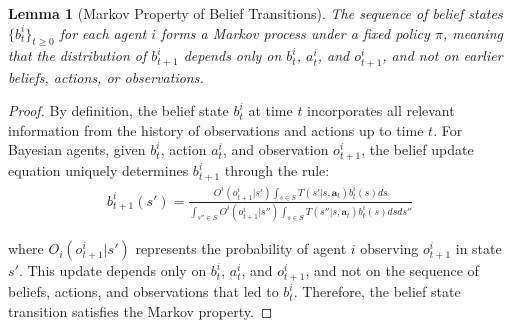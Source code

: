 \documentclass[a4paper,12pt]{report}
\newtheorem{lemma}{Lemma}
\begin{document}
\begin{lemma}[Markov Property of Belief Transitions]
    The sequence of belief states $\{b_{t}^{i}\}_{t \geq 0}$ for each agent $i$ forms
    a Markov process under a fixed policy $\pi$, meaning that the distribution of
    $b_{t+1}^{i}$ depends only on $b_{t}^{i}$, $a_{t}^{i}$, and $o_{t+1}^{i}$, and
    not on earlier beliefs, actions, or observations.
\end{lemma}

\begin{proof}
    By definition, the belief state $b_{t}^{i}$ at time $t$ incorporates all
    relevant information from the history of observations and actions up to time
    $t$. For Bayesian agents, given $b_{t}^{i}$, action $a_{t}^{i}$, and
    observation $o_{t+1}^{i}$, the belief update equation uniquely determines $b_{t+1}
            ^{i}$ through the rule:
    \begin{align}
        b^i_{t+1}(s') = \frac{O^i(o^i_{t+1}|s') \int_{s \in S} T(s'|s, \boldsymbol{a}_t) b^i_t(s) ds}{\int_{s'' \in S} O^i(o^i_{t+1}|s'') \int_{s \in S} T(s''|s, \boldsymbol{a}_t) b^i_t(s) ds ds''}
    \end{align}

    where $O_{i}(o_{t+1}^{i}|s')$ represents the probability of agent $i$ observing
    $o_{t+1}^{i}$ in state $s'$. This update depends only on $b_{t}^{i}$, $a_{t}^{i}$,
    and $o_{t+1}^{i}$, and not on the sequence of beliefs, actions, and observations
    that led to $b_{t}^{i}$. Therefore, the belief state transition satisfies the Markov
    property.
\end{proof}
\end{document}
